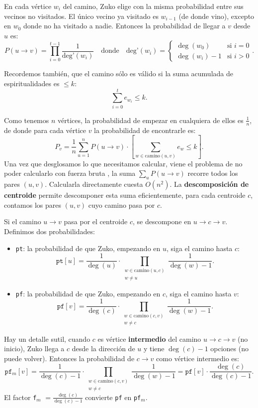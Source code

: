 En cada vértice $w_i$ del camino, Zuko elige con la misma probabilidad entre sus vecinos no visitados. El único vecino ya visitado es $w_{i-1}$ (de donde vino), excepto en $w_0$ donde no ha visitado a nadie.
Entonces la probabilidad de llegar a $v$ desde $u$ es:
\[
P(u \to v) = \prod_{i=0}^{t-1} \frac{1}{\text{deg'}(w_i)}
\quad \text{donde} \quad
\text{deg'}(w_i) = \begin{cases}
\deg(w_0) & \text{si } i = 0 \\
\deg(w_i) - 1 & \text{si } i > 0
\end{cases}.
\]
 
Recordemos también, que el camino sólo es válido si la suma acumulada de espiritualidades es $\leq k$:
\[
\sum_{i=0}^{t} e_{w_i} \leq k.
\]
 
Como tenemos $n$ vértices, la probabilidad de empezar en cualquiera de ellos es $\frac{1}{n}$, de donde para cada vértice $v$ la probabilidad de encontrarle es:
\[
P_v = \frac{1}{n} \sum_{u=1}^{n} P(u \to v) \cdot
\left[\sum_{w \in \text{camino}(u,v)} e_w \leq k\right].
\]
Una vez que desglosamos lo que necesitamos calcular, viene el problema de no poder calcularlo con fuerza bruta , la suma $\sum_u P(u \to v)$ recorre todos los pares $(u,v)$. Calcularla directamente cuesta $O(n^2)$. La \textbf{descomposición de centroide} permite descomponer esta suma eficientemente, para cada centroide $c$, contamos los pares $(u,v)$ cuyo camino pasa por $c$.

Si el camino $u \to v$ pasa por el centroide $c$, se descompone
en $u \to c \to v$. Definimos dos probabilidades:
 
\begin{itemize}
    \item \texttt{pt}: la probabilidad de que
          Zuko, empezando en $u$, siga el camino hasta $c$:
          \[
          \texttt{pt}[u] = \frac{1}{\deg(u)} \cdot
          \prod_{\substack{w \in \text{camino}(u,c) \\ w \neq u}}
          \frac{1}{\deg(w) - 1}.
          \]
 
    \item \texttt{pf}: la probabilidad
          de que Zuko, empezando en $c$, siga el camino hasta $v$:
          \[
          \texttt{pf}[v] = \frac{1}{\deg(c)} \cdot
          \prod_{\substack{w \in \text{camino}(c,v) \\ w \neq c}}
          \frac{1}{\deg(w) - 1}.
          \]
\end{itemize}
 
Hay un detalle sutil, cuando $c$ es vértice \textbf{intermedio} del
camino $u \to c \to v$ (no inicio), Zuko llega a $c$ desde la
dirección de $u$ y tiene $\deg(c) - 1$ opciones (no puede volver).
Entonces la probabilidad de $c \to v$ como vértice intermedio es:
\[
\texttt{pf$_{m}$}[v] = \frac{1}{\deg(c)-1} \cdot
\prod_{\substack{w \in \text{camino}(c,v) \\ w \neq c}}
\frac{1}{\deg(w) - 1}
= \texttt{pf}[v] \cdot \frac{\deg(c)}{\deg(c)-1}.
\]
El factor \texttt{f$_m$} $= \frac{\deg(c)}{\deg(c)-1}$
convierte \texttt{pf} en \texttt{pf$_{m}$}.
 
